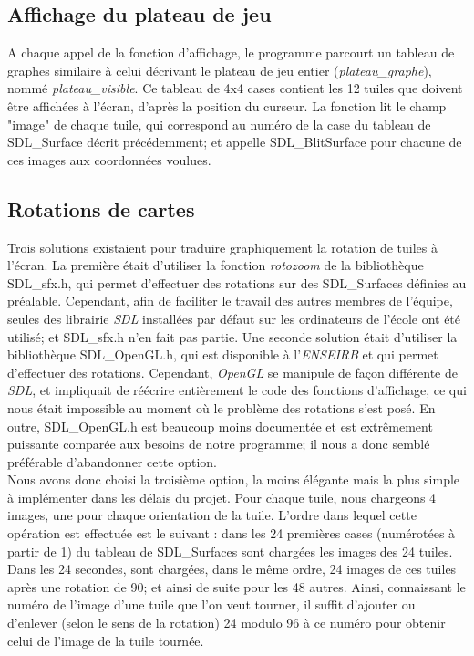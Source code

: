 \documentclass[a4paper, 11pt]{article}
\begin{document}
\subsection{Affichage du plateau de jeu}
\indent A chaque appel de la fonction d'affichage, le programme parcourt un tableau de graphes similaire à celui décrivant le plateau de jeu entier (\textit{plateau\_graphe}), nommé \textit{plateau\_visible}. Ce tableau de 4x4 cases contient les 12 tuiles que doivent être affichées à l'écran, d'après la position du curseur. La fonction lit le champ "image" de chaque tuile, qui correspond au numéro de la case du tableau de SDL\_Surface décrit précédemment; et appelle SDL\_BlitSurface pour chacune de ces images aux coordonnées voulues.
\
\subsection{Rotations de cartes}
\indent Trois solutions existaient pour traduire graphiquement la rotation de tuiles à l'écran. La première était d'utiliser la fonction \textit{rotozoom} de la bibliothèque SDL\_sfx.h, qui permet d'effectuer des rotations sur des SDL\_Surfaces définies au préalable. Cependant, afin de faciliter le travail des autres membres de l'équipe, seules des librairie \emph{SDL} installées par défaut sur les ordinateurs de l'école ont été utilisé; et SDL\_sfx.h n'en fait pas partie. Une seconde solution était d'utiliser la bibliothèque SDL\_OpenGL.h, qui est disponible à l'\emph{ENSEIRB} et qui permet d'effectuer des rotations. Cependant, \emph{OpenGL} se manipule de façon différente de \emph{SDL}, et impliquait de réécrire entièrement le code des fonctions d'affichage, ce qui nous était impossible au moment où le problème des rotations s'est posé. En outre, SDL\_OpenGL.h est beaucoup moins documentée et est extrêmement puissante comparée aux besoins de notre programme; il nous a donc semblé préférable d'abandonner cette option.\\
\indent Nous avons donc choisi la troisième option, la moins élégante mais la plus simple à implémenter dans les délais du projet. Pour chaque tuile, nous chargeons 4 images, une pour chaque orientation de la tuile. L'ordre dans lequel cette opération est effectuée est le suivant : dans les 24 premières cases (numérotées à partir de 1) du tableau de SDL\_Surfaces sont chargées les images des 24 tuiles. Dans les 24 secondes, sont chargées, dans le même ordre, 24 images de ces tuiles après une rotation de 90\degre; et ainsi de suite pour les 48 autres. Ainsi, connaissant le numéro de l'image d'une tuile que l'on veut tourner, il suffit d'ajouter ou d'enlever (selon le sens de la rotation) 24 modulo 96 à ce numéro pour obtenir celui de l'image de la tuile tournée.
\end{document}
